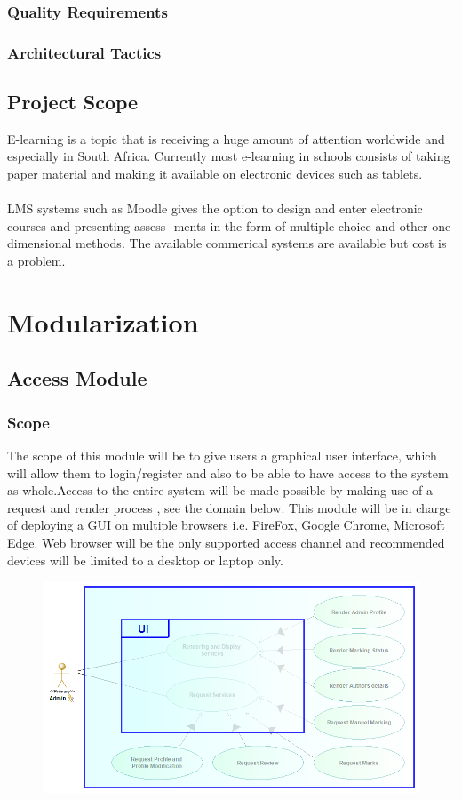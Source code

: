 \documentclass{article}
\begin{document}
		\subsubsection{Quality Requirements}
		\subsubsection{Architectural Tactics}
	
	\subsection{Project Scope}
	E-learning is a topic that is receiving a huge amount of attention worldwide and especially in South Africa.
Currently most e-learning in schools consists of taking paper material and making it available on electronic
devices such as tablets. \\\\
LMS systems such as Moodle gives the option to design and enter electronic courses and presenting assess-
ments in the form of multiple choice and other one-dimensional methods. The available commerical systems
are available but cost is a problem.

\section{Modularization}
	\subsection{Access Module}
		\subsubsection{Scope}
			 The scope of this module will be to give users a graphical user interface, which will allow them to login/register and also to be able to have access to the system as whole.Access to the entire system will be made possible by making use of a request and render process , see the domain below. This module will be in charge of deploying a GUI on multiple browsers i.e. FireFox, Google Chrome, Microsoft Edge. Web browser will be the only supported access channel  and recommended devices will be limited to a desktop or laptop only. 
		
			 \begin{figure}[H]
			\centering
				\includegraphics[width=450px]{Images/Access_Module/Pictures/Acess_Use_Case_Diagram_Scope}
			\end{figure}
\end{document}
